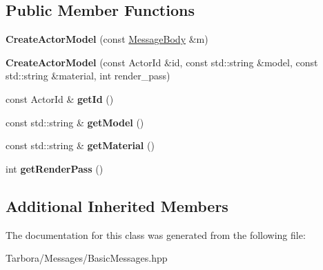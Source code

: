 \subsection*{Public Member Functions}
\begin{DoxyCompactItemize}
\item 
\mbox{\label{classTarbora_1_1Message_1_1CreateActorModel_aaca323d57bb2307b5a381eb901918c7c}} 
{\bfseries Create\+Actor\+Model} (const \hyperlink{classTarbora_1_1MessageBody}{Message\+Body} \&m)
\item 
\mbox{\label{classTarbora_1_1Message_1_1CreateActorModel_a1567478f4fa8904cba8290ba707d67d1}} 
{\bfseries Create\+Actor\+Model} (const Actor\+Id \&id, const std\+::string \&model, const std\+::string \&material, int render\+\_\+pass)
\item 
\mbox{\label{classTarbora_1_1Message_1_1CreateActorModel_ad513b7047d839b117131614dfef36981}} 
const Actor\+Id \& {\bfseries get\+Id} ()
\item 
\mbox{\label{classTarbora_1_1Message_1_1CreateActorModel_a472e819af3b414744a3036a15bc5b5e9}} 
const std\+::string \& {\bfseries get\+Model} ()
\item 
\mbox{\label{classTarbora_1_1Message_1_1CreateActorModel_ac7d8f3762505744d6f0ee5f2f2ca9340}} 
const std\+::string \& {\bfseries get\+Material} ()
\item 
\mbox{\label{classTarbora_1_1Message_1_1CreateActorModel_a3654fdadb01c5449c069aa2c02e111c8}} 
int {\bfseries get\+Render\+Pass} ()
\end{DoxyCompactItemize}
\subsection*{Additional Inherited Members}


The documentation for this class was generated from the following file\+:\begin{DoxyCompactItemize}
\item 
Tarbora/\+Messages/Basic\+Messages.\+hpp\end{DoxyCompactItemize}
